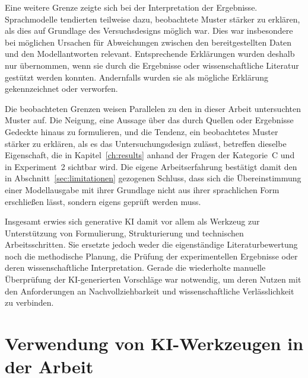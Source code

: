 Eine weitere Grenze zeigte sich bei der Interpretation der Ergebnisse. Sprachmodelle tendierten teilweise dazu, beobachtete Muster stärker zu erklären, als dies auf Grundlage des Versuchsdesigns möglich war. Dies war insbesondere bei möglichen Ursachen für Abweichungen zwischen den bereitgestellten Daten und den Modellantworten relevant. Entsprechende Erklärungen wurden deshalb nur übernommen, wenn sie durch die Ergebnisse oder wissenschaftliche Literatur gestützt werden konnten. Andernfalls wurden sie als mögliche Erklärung gekennzeichnet oder verworfen.

Die beobachteten Grenzen weisen Parallelen zu den in dieser Arbeit untersuchten Muster auf. Die Neigung, eine Aussage über das durch Quellen oder Ergebnisse Gedeckte hinaus zu formulieren, und die Tendenz, ein beobachtetes Muster stärker zu erklären, als es das Untersuchungsdesign zulässt, betreffen dieselbe Eigenschaft, die in Kapitel~\ref{ch:results} anhand der Fragen der Kategorie~C und in Experiment~2 sichtbar wird. Die eigene Arbeitserfahrung bestätigt damit den in Abschnitt~\ref{sec:limitationen} gezogenen Schluss, dass sich die Übereinstimmung einer Modellausgabe mit ihrer Grundlage nicht aus ihrer sprachlichen Form erschließen lässt, sondern eigens geprüft werden muss.

Insgesamt erwies sich generative KI damit vor allem als Werkzeug zur Unterstützung von Formulierung, Strukturierung und technischen Arbeitsschritten. Sie ersetzte jedoch weder die eigenständige Literaturbewertung noch die methodische Planung, die Prüfung der experimentellen Ergebnisse oder deren wissenschaftliche Interpretation. Gerade die wiederholte manuelle Überprüfung der KI-generierten Vorschläge war notwendig, um deren Nutzen mit den Anforderungen an Nachvollziehbarkeit und wissenschaftliche Verlässlichkeit zu verbinden.

\clearpage

\section{Verwendung von KI-Werkzeugen in der Arbeit}

